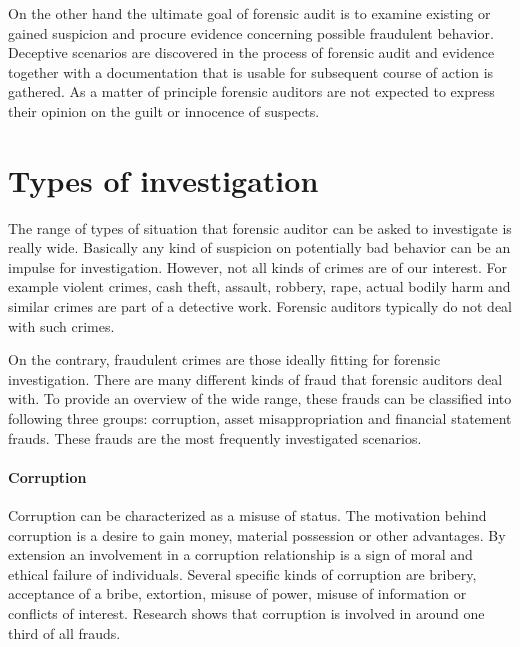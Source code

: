 On the other hand the ultimate goal of forensic audit is to examine existing or gained suspicion and procure evidence concerning possible fraudulent behavior. Deceptive scenarios are discovered in the process of forensic audit and evidence together with a documentation that is usable for subsequent course of action is gathered. As a matter of principle forensic auditors are not expected to express their opinion on the guilt or innocence of suspects.



\section{Types of investigation}

The range of types of situation that forensic auditor can be asked to investigate is really wide. Basically any kind of suspicion on potentially bad behavior can be an impulse for investigation. However, not all kinds of crimes are of our interest. For example violent crimes, cash theft, assault, robbery, rape, actual bodily harm and similar crimes are part of a detective work. Forensic auditors typically do not deal with such crimes. 

On the contrary, fraudulent crimes are those ideally fitting for forensic investigation. There are many different kinds of fraud that forensic auditors deal with. To provide an overview of the wide range, these frauds can be classified into following three groups: corruption, asset misappropriation and financial statement frauds. These frauds are the most frequently investigated scenarios.

\paragraph {Corruption}
Corruption can be characterized as a misuse of status. The motivation behind corruption is a desire to gain money, material possession or other advantages. By extension an involvement in a corruption relationship is a sign of moral and ethical failure of individuals. Several specific kinds of corruption are bribery, acceptance of a bribe, extortion, misuse of power, misuse of information or conflicts of interest. Research shows that corruption is involved in around one third of all frauds. 

